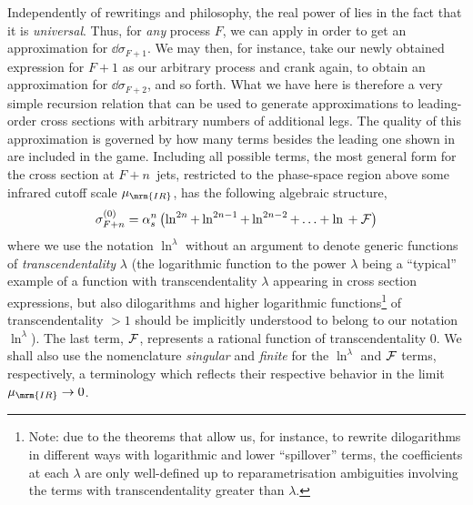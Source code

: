 Independently of rewritings and philosophy, 
the real power of  lies in the fact
that it is \emph{universal}. Thus, for
\emph{any} process $F$, we can apply  in order to
get an approximation for $\dd{\sigma_{F+1}}$. We may then, for instance,  
take our newly obtained expression for $F+1$ as our arbitrary process
and crank  again, to obtain an approximation for
$\dd{\sigma_{F+2}}$, and so forth. What we have here is therefore a
very simple recursion relation that can be used to generate approximations to
leading-order cross sections with arbitrary numbers of additional
legs. The quality 
of this approximation is governed by how many terms besides the leading
one shown in  are included in the game. Including
all possible terms, the most general form for the cross section at 
$F+n\,$ jets, restricted to the phase-space region above some 
infrared cutoff scale $\mu_{\mrm{IR}}$, has the following algebraic structure,
\begin{equation}
\sigma_{F+n}^{(0)} = \alpha_s^n \left( 
   \ln^{2n} 
 + \ln^{2n-1} 
 + \ln^{2n-2} 
 + \ldots 
 + \ln{}  
 + {\cal F} \right)  \label{eq:transcend}
\end{equation}
where we use the notation $\ln^\lambda$ without an argument  to denote 
generic functions of \emph{transcendentality} $\lambda$ (the
logarithmic function 
to the power $\lambda$ being a ``typical'' example of a function 
with transcendentality $\lambda$ appearing in cross section expressions, but
also dilogarithms and higher logarithmic functions\footnote{Note: 
due to the theorems 
that allow us, for instance, to rewrite dilogarithms in different
ways with logarithmic and lower ``spillover'' terms, the coefficients at each 
$\lambda$ are only well-defined up to reparametrisation ambiguities
involving the  terms with transcendentality greater than $\lambda$.} of
transcendentality $>1$ should be implicitly understood to belong to
our notation $\ln^\lambda$). The last term, $\cal F$, represents a rational
function of transcendentality 0. We shall also use the nomenclature 
\emph{singular} and \emph{finite} for  the $\ln^\lambda$ and 
${\cal F}$ terms, respectively,  a terminology which reflects their respective
behavior in the limit $\mu_{\mrm{IR}}\to 0$. 

